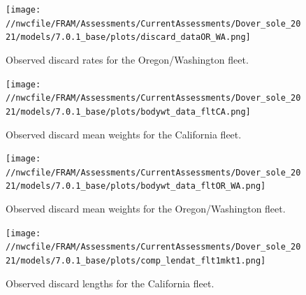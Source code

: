 \documentclass[11pt,
  english,
  a4paper,
]{article}
\begin{document}
\tagmcend\tagstructend


\begin{figure}
\centering
\texttt{[image: //nwcfile/FRAM/Assessments/CurrentAssessments/Dover\_sole\_2021/models/7.0.1\_base/plots/discard\_dataOR\_WA.png]}
\caption{Observed discard rates for the Oregon/Washington fleet.\label{fig:orwa-disc-ob}}
\end{figure}

\tagmcend\tagstructend


\begin{figure}
\centering
\texttt{[image: //nwcfile/FRAM/Assessments/CurrentAssessments/Dover\_sole\_2021/models/7.0.1\_base/plots/bodywt\_data\_fltCA.png]}
\caption{Observed discard mean weights for the California fleet.\label{fig:ca-disc-wght-ob}}
\end{figure}

\tagmcend\tagstructend


\begin{figure}
\centering
\texttt{[image: //nwcfile/FRAM/Assessments/CurrentAssessments/Dover\_sole\_2021/models/7.0.1\_base/plots/bodywt\_data\_fltOR\_WA.png]}
\caption{Observed discard mean weights for the Oregon/Washington fleet.\label{fig:orwa-disc-wght-ob}}
\end{figure}

\tagmcend\tagstructend


\begin{figure}
\centering
\texttt{[image: //nwcfile/FRAM/Assessments/CurrentAssessments/Dover\_sole\_2021/models/7.0.1\_base/plots/comp\_lendat\_flt1mkt1.png]}
\caption{Observed discard lengths for the California fleet.\label{fig:ca-disc-len-ob}}
\end{figure}

\tagmcend\tagstructend

\end{document}
